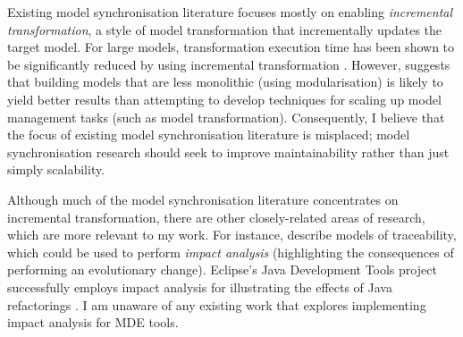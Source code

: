 Existing model synchronisation literature focuses mostly on enabling \textit{incremental transformation}, a style of model transformation that incrementally updates the target model. For large models, transformation execution time has been shown to be significantly reduced by using incremental transformation \cite{hearnden06incremental}. However, \cite{kolovos08scalability} suggests that building models that are less monolithic (using modularisation) is likely to yield better results than attempting to develop techniques for scaling up model management tasks (such as model transformation). Consequently, I believe that the focus of existing model synchronisation literature is misplaced; model synchronisation research should seek to improve maintainability rather than just simply scalability.  %

Although much of the model synchronisation literature concentrates on incremental transformation, there are other closely-related areas of research, which are more relevant to my work. For instance, \cite{jouault05loosely,drivalos08loosely} describe models of traceability, which could be used to perform \textit{impact analysis} (highlighting the consequences of performing an evolutionary change). Eclipse's Java Development Tools project successfully employs impact analysis for illustrating the effects of Java refactorings \cite{fuhrer07refactoring}. I am unaware of any existing work that explores implementing impact analysis for MDE tools.